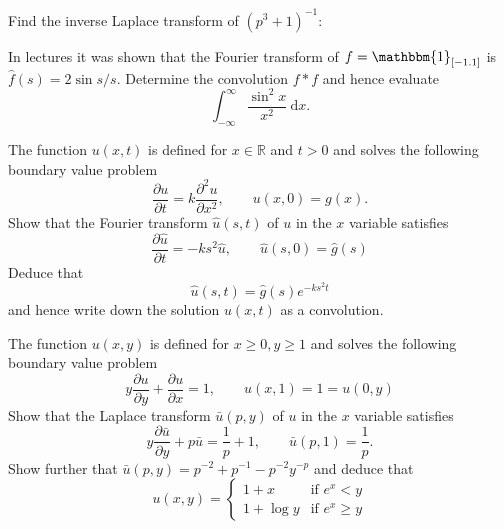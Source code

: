 \documentclass[answers]{exam}
\begin{document}
\begin{questions}



\question%
Find the inverse Laplace transform of $(p^{3}+1)^{-1}$:



\question%
In lectures it was shown that the Fourier transform of $f=\mathbbm{1}_{[-1.1]}$ is $\hat{f}(s)=2 \sin s / s$. Determine the convolution $f * f$ and hence evaluate \[
	\int_{-\infty}^{\infty} \frac{\sin ^{2} x}{x^{2}} \mathrm{~d} x.
\]



\question%
The function $u(x, t)$ is defined for $x \in \mathbb{R}$ and $t>0$ and solves the following boundary value problem \[
	\frac{\partial u}{\partial t}=k \frac{\partial^{2} u}{\partial x^{2}}, \qquad u(x, 0)=g(x).
\] Show that the Fourier transform $\hat{u}(s, t)$ of $u$ in the $x$ variable satisfies \[
	\frac{\partial \hat{u}}{\partial t}=-k s^{2} \hat{u}, \qquad \hat{u}(s, 0)=\hat{g}(s)
\] Deduce that \[
	\hat{u}(s, t)=\hat{g}(s) e^{-k s^{2} t}
\] and hence write down the solution $u(x, t)$ as a convolution.



\question%
The function $u(x, y)$ is defined for $x \geqslant 0, y \geqslant 1$ and solves the following boundary value problem \[
	y \frac{\partial u}{\partial y}+\frac{\partial u}{\partial x}=1, \qquad u(x, 1)=1=u(0, y)
\] Show that the Laplace transform $\bar{u}(p, y)$ of $u$ in the $x$ variable satisfies \[
	y \frac{\partial \bar{u}}{\partial y}+p \bar{u}=\frac{1}{p}+1, \qquad \bar{u}(p, 1)=\frac{1}{p} .
\] Show further that $\bar{u}(p, y)=p^{-2}+p^{-1}-p^{-2} y^{-p}$ and deduce that \[
	u(x, y)= \begin{cases}
		1+x & \text{if } e^{x}<y \\
		1+\log y & \text{if } e^{x} \geqslant y
	\end{cases}
\]

\end{questions}
\end{document}
